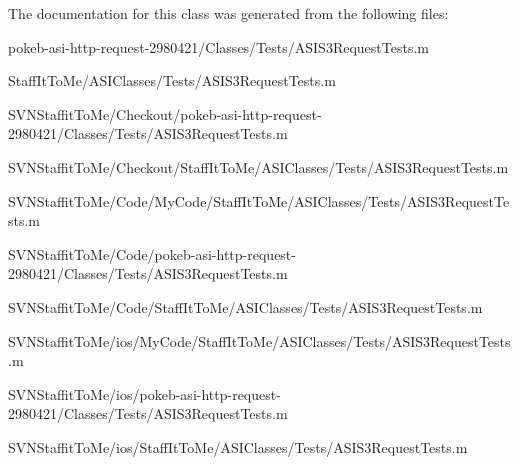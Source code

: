 \-The documentation for this class was generated from the following files\-:\begin{DoxyCompactItemize}
\item 
pokeb-\/asi-\/http-\/request-\/2980421/\-Classes/\-Tests/\-A\-S\-I\-S3\-Request\-Tests.\-m\item 
\-Staff\-It\-To\-Me/\-A\-S\-I\-Classes/\-Tests/\-A\-S\-I\-S3\-Request\-Tests.\-m\item 
\-S\-V\-N\-Staffit\-To\-Me/\-Checkout/pokeb-\/asi-\/http-\/request-\/2980421/\-Classes/\-Tests/\-A\-S\-I\-S3\-Request\-Tests.\-m\item 
\-S\-V\-N\-Staffit\-To\-Me/\-Checkout/\-Staff\-It\-To\-Me/\-A\-S\-I\-Classes/\-Tests/\-A\-S\-I\-S3\-Request\-Tests.\-m\item 
\-S\-V\-N\-Staffit\-To\-Me/\-Code/\-My\-Code/\-Staff\-It\-To\-Me/\-A\-S\-I\-Classes/\-Tests/\-A\-S\-I\-S3\-Request\-Tests.\-m\item 
\-S\-V\-N\-Staffit\-To\-Me/\-Code/pokeb-\/asi-\/http-\/request-\/2980421/\-Classes/\-Tests/\-A\-S\-I\-S3\-Request\-Tests.\-m\item 
\-S\-V\-N\-Staffit\-To\-Me/\-Code/\-Staff\-It\-To\-Me/\-A\-S\-I\-Classes/\-Tests/\-A\-S\-I\-S3\-Request\-Tests.\-m\item 
\-S\-V\-N\-Staffit\-To\-Me/ios/\-My\-Code/\-Staff\-It\-To\-Me/\-A\-S\-I\-Classes/\-Tests/\-A\-S\-I\-S3\-Request\-Tests.\-m\item 
\-S\-V\-N\-Staffit\-To\-Me/ios/pokeb-\/asi-\/http-\/request-\/2980421/\-Classes/\-Tests/\-A\-S\-I\-S3\-Request\-Tests.\-m\item 
\-S\-V\-N\-Staffit\-To\-Me/ios/\-Staff\-It\-To\-Me/\-A\-S\-I\-Classes/\-Tests/\-A\-S\-I\-S3\-Request\-Tests.\-m\end{DoxyCompactItemize}
